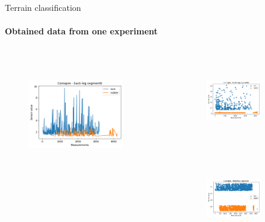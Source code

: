 \documentclass[aspectratio=169]{beamer}
\begin{document}
\begin{frame}[t]{Terrain classification}
    \framesubtitle{Obtained data from one experiment}
    \begin{columns}[T,onlytextwidth]
        \begin{column}{0.49\textwidth}
            \begin{figure}[H]
                \centering\includegraphics[height=5cm,width=1\textwidth,keepaspectratio]{s_shape_leg/segment6_compare.png}
            \end{figure}
        \end{column}
        \begin{column}{0.49\textwidth}
            \vspace{-2.4cm}
            \begin{figure}[H]
                \begin{subfigure}{0.99\textwidth}
                    \centering\includegraphics[height=3.8cm,width=1\textwidth,keepaspectratio]{s_shape_leg/segment8_compare_front.png}
                \end{subfigure}

                \begin{subfigure}{0.99\textwidth}
                    \centering\includegraphics[height=3.8cm,width=1\textwidth,keepaspectratio]{s_shape_leg/segment6_compare_front.png}
                \end{subfigure}
            \end{figure}
        \end{column}
    \end{columns}
\end{frame}
\end{document}
